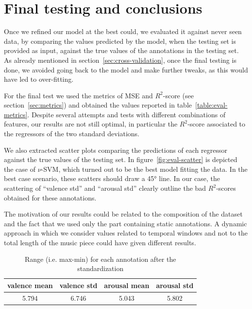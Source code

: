 \section{Final testing and conclusions}\label{sec:conclusions}

Once we refined our model at the best could, we evaluated it against never seen data, by comparing the values predicted by the model, when the testing set is provided as input, against the true values of the annotations in the testing set. As already mentioned in section~\ref{sec:cross-validation}, once the final testing is done, we avoided going back to the model and make further tweaks, as this would have led to over-fitting.

For the final test we used the metrics of MSE and $R^2$-score (see section~\ref{sec:metrics}) and obtained the values reported in table~\ref{table:eval-metrics}. Despite several attempts and tests with different combinations of features, our results are not still optimal, in particular the $R^2$-score associated to the regressors of the two standard deviations. 

We also extracted scatter plots comparing the predictions of each regressor against the true values of the testing set. In  figure~\ref{fig:eval-scatter} is depicted the case of $\nu$-SVM, which turned out to be the best model fitting the data. In the best case scenario, these scatters should draw a 45° line. In our case, the scattering of ``valence std'' and ``arousal std'' clearly outline the bad $R^2$-scores obtained for these annotations. 

The motivation of our results could be related to the composition of the dataset and the fact that we used only the part containing static annotations. A dynamic approach in which we consider values related to temporal windows and not to the total length of the music piece could have given different results. 

\begin{table}
	\centering
	\begin{tabular}{cccc}
		\toprule
		valence mean & valence std & arousal mean & arousal std \\
		\midrule
	    5.794 & 6.746 & 5.043 & 5.802 \\
		\bottomrule
	\end{tabular}
	\caption{Range (i.e. max-min) for each annotation after the standardization}
	\label{table:annot-ranges}
\end{table}


